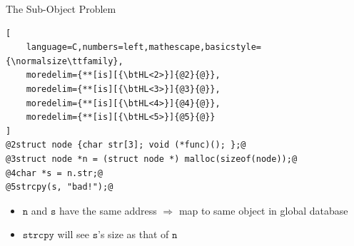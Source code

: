 \documentclass[aspectratio=169]{beamer}
\begin{document}
\begin{frame}[fragile]{The Sub-Object Problem}
\begin{lstlisting}[
    language=C,numbers=left,mathescape,basicstyle={\normalsize\ttfamily},
    moredelim={**[is][{\btHL<2>}]{@2}{@}},
    moredelim={**[is][{\btHL<3>}]{@3}{@}},
    moredelim={**[is][{\btHL<4>}]{@4}{@}},
    moredelim={**[is][{\btHL<5>}]{@5}{@}}
]
@2struct node {char str[3]; void (*func)(); };@
@3struct node *n = (struct node *) malloc(sizeof(node));@
@4char *s = n.str;@
@5strcpy(s, "bad!");@
\end{lstlisting}


    \begin{itemize}
        \item $\texttt{n}$ and $\texttt{s}$ have the same address $\Rightarrow$ map to same object in global database
        \item $\texttt{strcpy}$ will see $\texttt{s}$'s size as that of $\texttt{n}$
    \end{itemize}

\end{frame}

\end{document}
